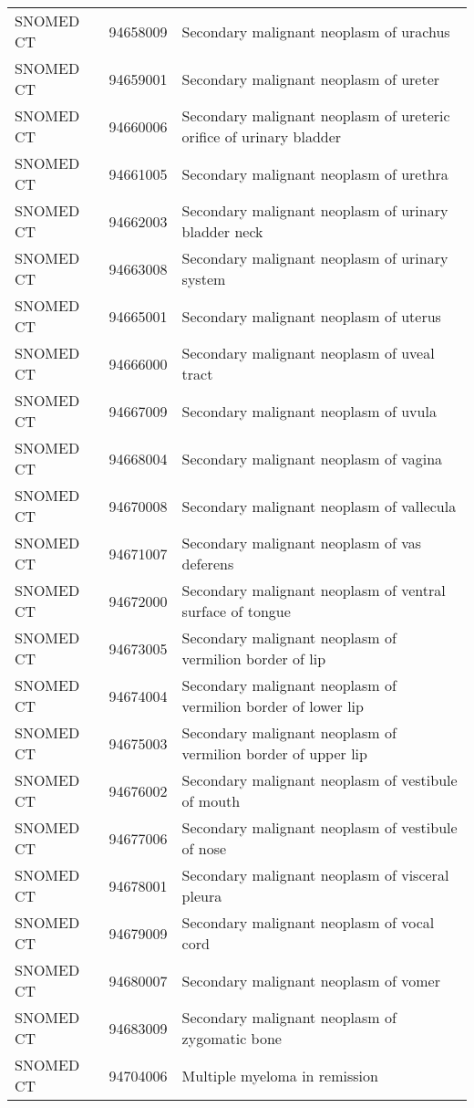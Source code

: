 \begin{longtable}{p{}p{}p{}}
  SNOMED CT & 94658009 & Secondary malignant neoplasm of urachus \\ 
  SNOMED CT & 94659001 & Secondary malignant neoplasm of ureter \\ 
  SNOMED CT & 94660006 & Secondary malignant neoplasm of ureteric orifice of urinary bladder \\ 
  SNOMED CT & 94661005 & Secondary malignant neoplasm of urethra \\ 
  SNOMED CT & 94662003 & Secondary malignant neoplasm of urinary bladder neck \\ 
  SNOMED CT & 94663008 & Secondary malignant neoplasm of urinary system \\ 
  SNOMED CT & 94665001 & Secondary malignant neoplasm of uterus \\ 
  SNOMED CT & 94666000 & Secondary malignant neoplasm of uveal tract \\ 
  SNOMED CT & 94667009 & Secondary malignant neoplasm of uvula \\ 
  SNOMED CT & 94668004 & Secondary malignant neoplasm of vagina \\ 
  SNOMED CT & 94670008 & Secondary malignant neoplasm of vallecula \\ 
  SNOMED CT & 94671007 & Secondary malignant neoplasm of vas deferens \\ 
  SNOMED CT & 94672000 & Secondary malignant neoplasm of ventral surface of tongue \\ 
  SNOMED CT & 94673005 & Secondary malignant neoplasm of vermilion border of lip \\ 
  SNOMED CT & 94674004 & Secondary malignant neoplasm of vermilion border of lower lip \\ 
  SNOMED CT & 94675003 & Secondary malignant neoplasm of vermilion border of upper lip \\ 
  SNOMED CT & 94676002 & Secondary malignant neoplasm of vestibule of mouth \\ 
  SNOMED CT & 94677006 & Secondary malignant neoplasm of vestibule of nose \\ 
  SNOMED CT & 94678001 & Secondary malignant neoplasm of visceral pleura \\ 
  SNOMED CT & 94679009 & Secondary malignant neoplasm of vocal cord \\ 
  SNOMED CT & 94680007 & Secondary malignant neoplasm of vomer \\ 
  SNOMED CT & 94683009 & Secondary malignant neoplasm of zygomatic bone \\ 
  SNOMED CT & 94704006 & Multiple myeloma in remission \\ 

\end{longtable}
